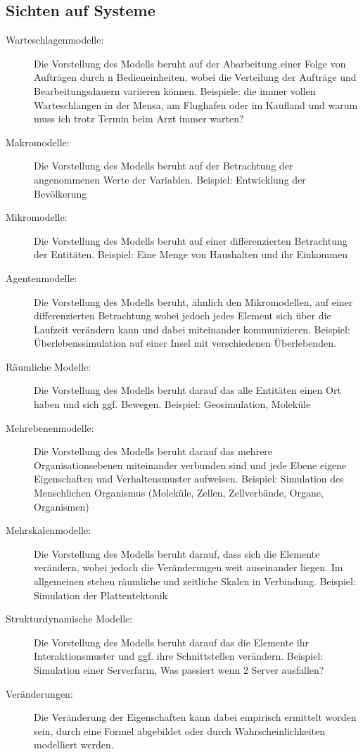 \documentclass[11pt, fleqn, a4paper, leqno]{scrartcl} %
\begin{document}
	\subsection{Sichten auf Systeme}
	\begin{description}
		\item[Warteschlagenmodelle:]Die Vorstellung des Modells beruht auf der Abarbeitung einer Folge von Aufträgen durch n Bedieneinheiten, wobei die Verteilung der Aufträge und Bearbeitungsdauern variieren können. Beispiele: die immer vollen Warteschlangen in der Mensa, am Flughafen oder im Kaufland und warum muss ich trotz Termin beim Arzt immer warten?
		\item[Makromodelle:] Die Vorstellung des Modells beruht auf der Betrachtung der angenommenen Werte der Variablen. Beispiel: Entwicklung der Bevölkerung
		\item[Mikromodelle:] Die Vorstellung des Modells beruht auf einer differenzierten Betrachtung der Entitäten. Beispiel: Eine Menge von Haushalten und ihr Einkommen
		\item[Agentenmodelle:] Die Vorstellung des Modells beruht, ähnlich den Mikromodellen, auf einer differenzierten Betrachtung wobei jedoch jedes Element sich über die Laufzeit verändern kann und dabei miteinander kommunizieren. Beispiel: Überlebenssimulation auf einer Insel mit verschiedenen Überlebenden.
		\item[Räumliche Modelle:] Die Vorstellung des Modells beruht darauf das alle Entitäten einen Ort haben und sich ggf. Bewegen. Beispiel: Geosimulation, Moleküle
		\item[Mehrebenenmodelle:] Die Vorstellung des Modells beruht darauf das mehrere Organisationsebenen miteinander verbunden sind und jede Ebene eigene Eigenschaften und Verhaltensmuster aufweisen. Beispiel: Simulation des Menschlichen Organismus (Moleküle, Zellen, Zellverbände, Organe, Organismen)
		\item[Mehrskalenmodelle:]  Die Vorstellung des Modells beruht darauf, dass sich die Elemente verändern, wobei jedoch die Veränderungen weit auseinander liegen. Im allgemeinen stehen räumliche und zeitliche Skalen in Verbindung. Beispiel: Simulation der Plattentektonik
		\item[Strukturdynamische Modelle:] Die Vorstellung des Modells beruht darauf das die Elemente ihr Interaktionsmuster und ggf. ihre Schnittstellen verändern. Beispiel: Simulation einer Serverfarm, Was passiert wenn 2 Server ausfallen?
		\item[Veränderungen:] Die Veränderung der Eigenschaften kann dabei empirisch ermittelt worden sein, durch eine Formel abgebildet oder durch Wahrscheinlichkeiten modelliert werden.
	\end{description}
\end{document}
